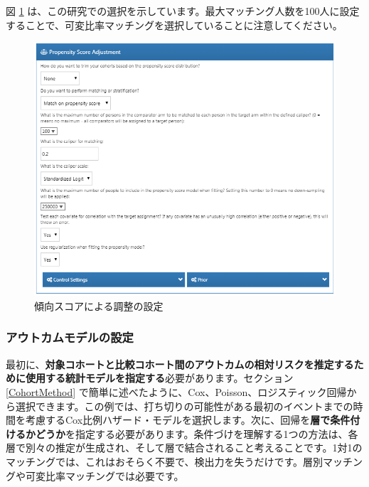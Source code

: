 \documentclass[
  11pt]{book}
\theoremstyle{definition}
\theoremstyle{definition}
\theoremstyle{definition}
\theoremstyle{definition}
\theoremstyle{remark}
\begin{document}
図 \ref{fig:psSettings} は、この研究での選択を示しています。最大マッチング人数を100人に設定することで、可変比率マッチングを選択していることに注意してください。

\begin{figure}

{\centering \includegraphics[width=1\linewidth]{images/PopulationLevelEstimation/psSettings} 

}

\caption{傾向スコアによる調整の設定}\label{fig:psSettings}
\end{figure}

\subsubsection*{アウトカムモデルの設定}\label{ux30a2ux30a6ux30c8ux30abux30e0ux30e2ux30c7ux30ebux306eux8a2dux5b9a}

最初に、\textbf{対象コホートと比較コホート間のアウトカムの相対リスクを推定するために使用する統計モデルを指定する}必要があります。セクション \ref{CohortMethod} で簡単に述べたように、Cox、Poisson、ロジスティック回帰から選択できます。この例では、打ち切りの可能性がある最初のイベントまでの時間を考慮するCox比例ハザード・モデルを選択します。次に、回帰を\textbf{層で条件付けるかどうか}を指定する必要があります。条件づけを理解する1つの方法は、各層で別々の推定が生成され、そして層で結合されること考えることです。1対1のマッチングでは、これはおそらく不要で、検出力を失うだけです。層別マッチングや可変比率マッチングでは必要です。 
\end{document}
